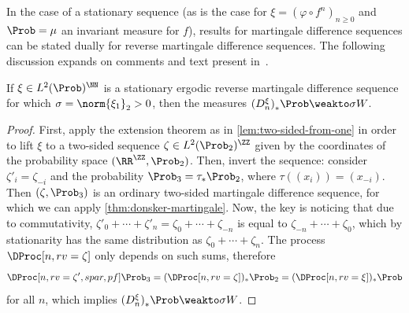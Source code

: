 \documentclass[../main]{subfiles}
\begin{document}
In the case of a stationary sequence (as is the case for \(\xi = (\varphi \circ f^{n})_{n \geq 0}\) and \(\Prob = \mu\) an invariant measure for \(f\)), results for martingale difference sequences can be stated dually for reverse martingale difference sequences. The following discussion expands on comments and text present in~\cite[Appendix M22 and Section 19]{billingsleyConvergenceProbabilityMeasures1999}.

\begin{corollary}\label{cor:donsker-martingale}
  If \(\xi \in L^2(\Prob)^{\NN}\) is a stationary ergodic reverse martingale difference sequence for which \(\sigma = \norm{\xi_1}_2 > 0\), then the measures \({(D^{\xi}_n)}_* \Prob \weakto \sigma W\).
\end{corollary}

\begin{proof}
  First, apply the extension theorem as in \cref{lem:two-sided-from-one} in order to lift \(\xi\) to a two-sided sequence \(\zeta \in L^2(\Prob_2)^{\ZZ}\) given by the coordinates of the probability space \((\RR^{\ZZ},\Prob_2)\). Then, invert the sequence: consider \(\zeta'_i = \zeta_{-i}\) and the probability \(\Prob_3 = \tau_*\Prob_2\), where  \(\tau((x_i)) = (x_{-i})\). Then \((\zeta,\Prob_3)\) is an ordinary two-sided martingale difference sequence, for which we can apply \cref{thm:donsker-martingale}. Now, the key is noticing that due to commutativity, \(\zeta'_0 + \cdots + \zeta'_n = \zeta_{0} + \cdots + \zeta_{-n}\) is equal to \(\zeta_{-n} + \cdots + \zeta_0\), which by stationarity  has the same distribution as \(\zeta_0 + \cdots + \zeta_n\). The process \(\DProc[n,rv = \zeta]\) only depends on such sums, therefore
  \begin{equation*}
    \DProc[n, rv = \zeta', spar, pf] \Prob_3 = (\DProc[n, rv = \zeta])_* \Prob_2 = (\DProc[n, rv = \xi])_* \Prob
  \end{equation*}
  for all \(n\), which implies \({(D^{\xi}_n)}_* \Prob \weakto \sigma W\).
\end{proof}
\end{document}
